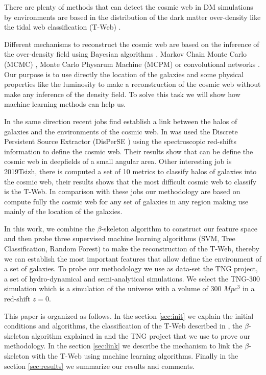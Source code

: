 \documentclass[usenatbib]{mnras}
\begin{document}
There are plenty of methods that can detect the cosmic web 
in DM simulations 
by environments are based in
the distribution of the dark matter over-density like the tidal web
classification (T-Web) \cite{2007Hahn,2009Forero-Romero}. 


Different mechanisms to reconstruct the cosmic web are based on the inference of the over-density field using Bayesian algorithms \cite{2015LeclercqJasche,2018Simola}, Markov Chain Monte Carlo (MCMC) \cite{2016Wang}, Monte Carlo Physarum Machine (MCPM) \cite{2020Burchett} or convolutional networks \cite{2019Zhang}. Our purpose is to use directly the location of the galaxies and some physical properties like the luminosity to make a reconstruction of the cosmic web without make any inference of the density field. To solve this task we will show how machine learning methods can help us.

In the same direction recent jobs find establish a link between the halos of galaxies and the environments of the cosmic web. In \cite{2019Luber} was used the Discrete Persistent Source Extractor (DisPerSE \cite{2010Sousbie})  using the spectroscopic red-shifts information to define the cosmic web. Their results show that can be define the cosmic web in deepfields of a small angular area. Other interesting job is 2019Tsizh, there is computed a set of 10 metrics to classify halos of galaxies into the cosmic web, their results shows that the most difficult cosmic web to classify is the T-Web. In comparison with these jobs our methodology are based on compute fully the cosmic web for any set of galaxies in any region making use mainly of the location of the galaxies.

In this work, we combine the $\beta$-skeleton algorithm to construct our feature space and then probe three supervised machine learning algorithms (SVM, Tree Classification, Random Forest) to make the reconstruction of the T-Web, thereby we can establish the most important features that allow define the environment of a set of galaxies. To probe our methodology we use as data-set the TNG project, a set of hydro-dynamical and semi-analytical simulations. We select  the TNG-300 simulation which is a simulation of the universe with a volume of 300 $Mpc^3$ in a red-shift $z=0$.

This paper is organized as follows. In the section \ref{sec:init} we explain the initial conditions and algorithms, the classification of the T-Web described in \cite{2009Forero-Romero}, the $\beta$-skeleton algorithm  explained in \cite{1985Kirkpatrick} and the TNG project that we use to prove our methodology. In the section \ref{sec:link} we describe the mechanism to link the $\beta$-skeleton with the T-Web using machine learning algorithms. Finally in the section \ref{sec:results} we summarize our results and comments.
\end{document}
